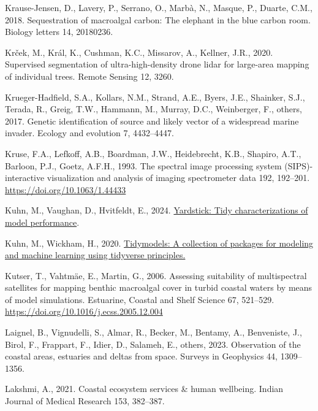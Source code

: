 \documentclass[
  letterpaper,
  11pt,
  english,
  singlespacing,
  headsepline]{MastersDoctoralThesis}
\newlength{\cslhangindent}
\newenvironment{CSLReferences}[2] %
 {\begin{list}{}{%
  \setlength{\itemindent}{0pt}
  \setlength{\leftmargin}{0pt}
  \setlength{\parsep}{0pt}
  \ifodd #1
   \setlength{\leftmargin}{\cslhangindent}
   \setlength{\itemindent}{-1\cslhangindent}
  \fi
  \setlength{\itemsep}{#2\baselineskip}}}
 {\end{list}}
\begin{document}
\begin{CSLReferences}{1}{0}
Krause-Jensen, D., Lavery, P., Serrano, O., Marbà, N., Masque, P.,
Duarte, C.M., 2018. Sequestration of macroalgal carbon: The elephant in
the blue carbon room. Biology letters 14, 20180236.

Krček, M., Král, K., Cushman, K.C., Missarov, A., Kellner, J.R., 2020.
Supervised segmentation of ultra-high-density drone lidar for large-area
mapping of individual trees. Remote Sensing 12, 3260.

Krueger-Hadfield, S.A., Kollars, N.M., Strand, A.E., Byers, J.E.,
Shainker, S.J., Terada, R., Greig, T.W., Hammann, M., Murray, D.C.,
Weinberger, F., others, 2017. Genetic identification of source and
likely vector of a widespread marine invader. Ecology and evolution 7,
4432--4447.

Kruse, F.A., Lefkoff, A.B., Boardman, J.W., Heidebrecht, K.B., Shapiro,
A.T., Barloon, P.J., Goetz, A.F.H., 1993. {The spectral image processing
system (SIPS)-interactive visualization and analysis of imaging
spectrometer data} 192, 192--201. \url{https://doi.org/10.1063/1.44433}

Kuhn, M., Vaughan, D., Hvitfeldt, E., 2024.
\href{https://CRAN.R-project.org/package=yardstick}{Yardstick: Tidy
characterizations of model performance}.

Kuhn, M., Wickham, H., 2020.
\href{https://www.tidymodels.org}{Tidymodels: A collection of packages
for modeling and machine learning using tidyverse principles.}

Kutser, T., Vahtmäe, E., Martin, G., 2006. {Assessing suitability of
multispectral satellites for mapping benthic macroalgal cover in turbid
coastal waters by means of model simulations}. Estuarine, Coastal and
Shelf Science 67, 521--529.
\url{https://doi.org/10.1016/j.ecss.2005.12.004}

Laignel, B., Vignudelli, S., Almar, R., Becker, M., Bentamy, A.,
Benveniste, J., Birol, F., Frappart, F., Idier, D., Salameh, E., others,
2023. Observation of the coastal areas, estuaries and deltas from space.
Surveys in Geophysics 44, 1309--1356.

Lakshmi, A., 2021. Coastal ecosystem services \& human wellbeing. Indian
Journal of Medical Research 153, 382--387.


\end{CSLReferences}
\end{document}
